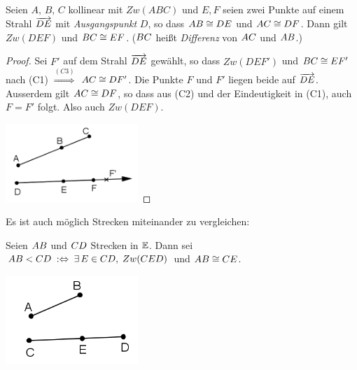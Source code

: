 \begin{thm}\label{thm:satz.s1f}
    Seien $A,\, B,\, C$ kollinear mit $Zw(ABC)$ und $E,F$ seien zwei Punkte auf einem Strahl
    $\mbox{${\overrightarrow{DE}}$}$ mit {\em Ausgangspunkt} $D$, so dass ${AB} \cong {DE}$ und ${AC} \cong
    {DF}$. Dann gilt $Zw(DEF)$ und ${BC} \cong {EF}$.  (${BC}$ heißt
    \emph{Differenz} von ${AC}$ und ${AB}$.)
\end{thm}

\begin{proof}
    Sei $F'$ auf dem Strahl $\mbox{${\overrightarrow{DE}}$}$ gewählt, so dass $Zw(DEF')$ und ${BC} \cong {EF'}$
    nach (C1) $\stackrel{(C3)}{\Longrightarrow}$ ${AC} \cong {DF'}$. Die Punkte $F$ und
    $F'$ liegen beide auf $\mbox{${\overrightarrow{DE}}$}$. Ausserdem gilt ${AC} \cong {DF}$, so dass aus (C2) und
    der Eindeutigkeit in (C1), auch $F=F'$ folgt. Also auch $Zw(DEF)$.

    \centerline{\includegraphics[width=5cm]{BILDER/1-2-04-Diff.png}}
\end{proof}

Es ist auch möglich Strecken miteinander zu vergleichen:

\begin{defi}
    Seien ${AB}$ und ${CD}$ Strecken in $\mathbb E$. Dann sei ${AB} < {CD}\;:
    \Leftrightarrow\; \exists\, E \in {CD},\; Zw(CED)$ und ${AB} \cong {CE}$.
\end{defi}

\centerline{\includegraphics[width=5cm]{BILDER/1-2-05-Ord.png}}

